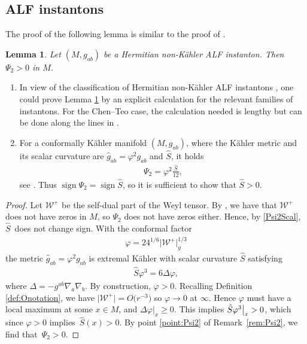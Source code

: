 \documentclass[10pt,a4paper]{amsart}
\numberwithin{equation}{section}
\newtheorem{Lemma}[Theorem]{Lemma}
\begin{document}
\subsection{ALF instantons}
The proof of the following lemma is similar to the proof of \cite[Theorem~A]{biquard2023gravitational}.
\begin{Lemma}\label{lem:Psi2}
Let $(M, g_{ab})$ be a Hermitian non-K\"ahler ALF instanton. Then $\Psi_2 > 0$ in $M$.
\end{Lemma}
\begin{Remark}\label{rem:Psi2}\quad
\begin{enumerate}\itemsep=0pt
\item
In view of the classification of Hermitian non-K\"ahler ALF instantons \cite{li2023classification}, one could prove Lemma \ref{lem:Psi2} by an explicit calculation for the relevant families of instantons. For the Chen--Teo case, the calculation needed is lengthy but can be done along the lines in \cite{aksteiner2021gravitational}.
\item \label{point:Psi2}
For a conformally K\"ahler manifold $(M,g_{ab})$, where the K\"ahler metric and its scalar curvature are $\hat{g}_{ab}=\varphi^2 g_{ab}$ and $\hat{S}$, it holds
\begin{align}\label{Psi2Scal}
\Psi_{2}=\varphi^2 \frac{\hat{S}}{12},
\end{align}
see \cite{araneda2023}. Thus $\operatorname{sign}\Psi_2=\operatorname{sign}\hat{S}$, so it is sufficient to show that $\hat{S}>0$.
\end{enumerate}
\end{Remark}
\begin{proof}
Let $\mathcal{W}^+$ be the self-dual part of the Weyl tensor.
By \cite[Proposition~5, p.~420]{MR707181}, we have that $\mathcal{W}^+$ does not have zeros in $M$, so $\Psi_2$ does not have zeros either. Hence, by \eqref{Psi2Scal}, $\hat{S}$~does not change sign.
With the conformal factor
\begin{align}\label{CF}
\varphi = 24^{1/6} \bigl|\mathcal{W}^+\bigr|_g^{1/3}
\end{align}
the metric $\hat g_{ab} = \varphi^2 g_{ab}$ is extremal K\"ahler with scalar curvature $\hat{S}$ satisfying
\begin{align*}
\hat{S} \varphi^3 = 6 \Delta \varphi,
\end{align*}
where $\Delta = -g^{ab} \nabla_a \nabla_b$. By construction, $\varphi > 0$. Recalling Definition \ref{def:Onotation}, we have $\bigl|\mathcal{W}^+\bigr| = O\bigl(r^{-3}\bigr) $ so $\varphi \to 0$ at $\infty$. Hence $\varphi$ must have a local maximum at some $x \in M$, and $\Delta \varphi {|}_{x} \geq 0$. This implies $\hat S \varphi^3 \big{|}_x > 0$, which since $\varphi > 0$ implies~${\hat S(x) > 0}$.
By point \eqref{point:Psi2} of Remark~\ref{rem:Psi2}, we find that~${\Psi_2 > 0}$.
\end{proof}
\end{document}
